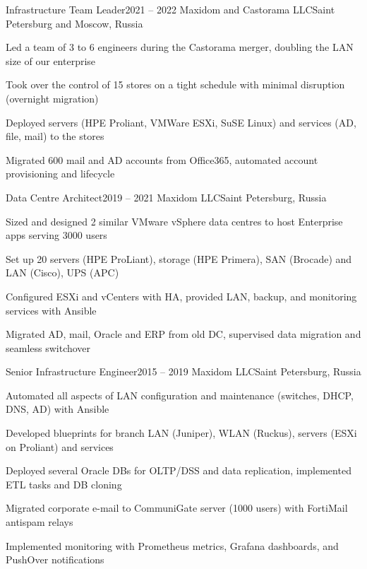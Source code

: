 
\expSubHeading
  {Infrastructure Team Leader}{2021 -- 2022}
  {Maxidom and Castorama LLC}{Saint Petersburg and Moscow, Russia}
\begin{zitemize}
\item Led a team of 3 to 6 engineers during the Castorama merger, doubling the LAN size of our enterprise
\item Took over the control of 15 stores on a tight schedule with minimal disruption (overnight migration)
\item Deployed servers (HPE Proliant, VMWare ESXi, SuSE Linux) and services (AD, file, mail) to the stores
\item Migrated 600 mail and AD accounts from Office365, automated account provisioning and lifecycle
\end{zitemize}

\expSubHeading
  {Data Centre Architect}{2019 -- 2021}
  {Maxidom LLC}{Saint Petersburg, Russia}
\begin{zitemize}
\item Sized and designed 2 similar VMware vSphere data centres to host Enterprise apps serving 3000 users
\item Set up 20 servers (HPE ProLiant), storage (HPE Primera), SAN (Brocade) and LAN (Cisco), UPS (APC)
\item Configured ESXi and vCenters with HA, provided LAN, backup, and monitoring services with Ansible
\item Migrated AD, mail, Oracle and ERP from old DC, supervised data migration and seamless switchover
\end{zitemize}

\expSubHeading
  {Senior Infrastructure Engineer}{2015 -- 2019}
  {Maxidom LLC}{Saint Petersburg, Russia}
\begin{zitemize}
\item Automated all aspects of LAN configuration and maintenance (switches, DHCP, DNS, AD) with Ansible
\item Developed blueprints for branch LAN (Juniper), WLAN (Ruckus), servers (ESXi on Proliant) and services
\item Deployed several Oracle DBs for OLTP/DSS and data replication, implemented ETL tasks and DB cloning
\item Migrated corporate e-mail to CommuniGate server (1000 users) with FortiMail antispam relays
\item Implemented monitoring with Prometheus metrics, Grafana dashboards, and PushOver notifications
\end{zitemize}

